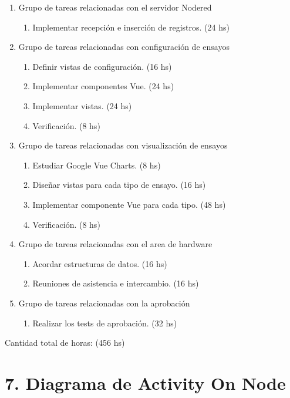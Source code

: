 \documentclass[11pt]{charter}
\begin{document}
\begin{enumerate}
\item Grupo de tareas relacionadas con el servidor Nodered
	\begin{enumerate}
	\item Implementar recepción e inserción de registros. (24 hs)
	\end{enumerate}

\item Grupo de tareas relacionadas con configuración de ensayos
	\begin{enumerate}
	\item Definir vistas de configuración. (16 hs)
	\item Implementar componentes Vue. (24 hs)
	\item Implementar vistas. (24 hs)
	\item Verificación. (8 hs)
	\end{enumerate}

\item Grupo de tareas relacionadas con visualización de ensayos
	\begin{enumerate}
	\item Estudiar Google Vue Charts. (8 hs)
	\item Diseñar vistas para cada tipo de ensayo. (16 hs)
	\item Implementar componente Vue para cada tipo. (48 hs)
	\item Verificación. (8 hs)
	\end{enumerate}

\item Grupo de tareas relacionadas con el area de hardware
	\begin{enumerate}
	\item Acordar estructuras de datos. (16 hs)
	\item Reuniones de asistencia e intercambio. (16 hs)
	\end{enumerate}

\item Grupo de tareas relacionadas con la aprobación
	\begin{enumerate}
	\item Realizar los tests de aprobación. (32 hs)
	\end{enumerate}

\end{enumerate}

Cantidad total de horas: (456 hs)



\section{7. Diagrama de Activity On Node}
\label{sec:AoN}
\end{document}
